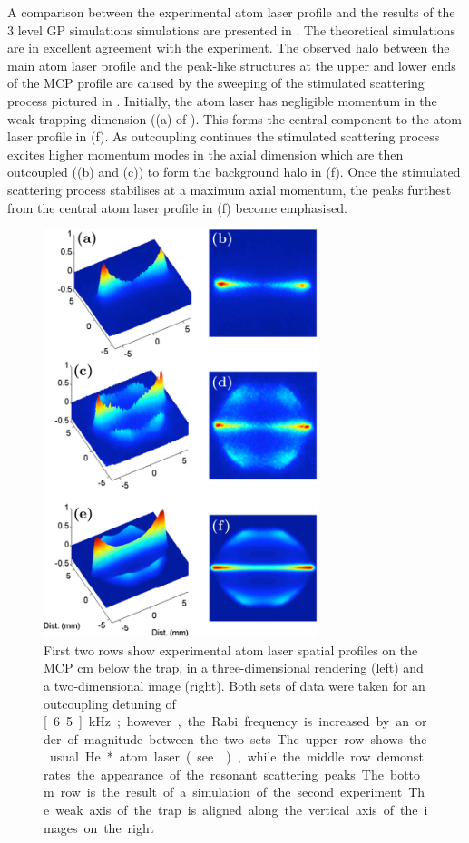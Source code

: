A comparison between the experimental atom laser profile and the results of the 3 level GP simulations simulations are presented in . The theoretical simulations are in excellent agreement with the experiment. The observed halo between the main atom laser profile and the peak-like structures at the upper and lower ends of the MCP profile are caused by the sweeping of the stimulated scattering process pictured in . Initially, the atom laser has negligible momentum in the weak trapping dimension ((a) of ). This forms the central component to the atom laser profile in (f). As outcoupling continues the stimulated scattering process excites higher momentum modes in the axial dimension which are then outcoupled ((b) and (c)) to form the background halo in (f). Once the stimulated scattering process stabilises at a maximum axial momentum, the peaks furthest from the central atom laser profile in (f) become emphasised.

\begin{figure}
    \centering
    \includegraphics[width=8cm]{ExpTheoryComparison}
    \caption{First two rows show experimental atom laser spatial profiles on the MCP \unit[4]{cm} below the trap, in a three-dimensional rendering (left) and a two-dimensional image (right). Both sets of data were taken for an outcoupling detuning of \unit[6.5]{kHz}; however, the Rabi frequency is increased by an order of magnitude between the two sets. The upper row shows the usual He* atom laser (see ), while the middle row demonstrates the appearance of the resonant scattering peaks. The bottom row is the result of a simulation of the second experiment. The weak axis of the trap is aligned along the vertical axis of the images on the right.\label{Peaks:ExpTheoryComparison}}
\end{figure}

